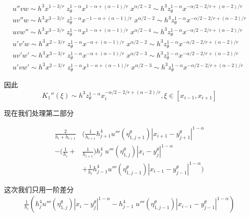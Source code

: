 \documentclass{ctexart}
\begin{document}
\begin{gather}
    u''vw \sim h^3 x^{1-3/r} \; z_\theta^{1-\alpha} x^{1-\alpha + (\alpha-1)/r}\; x^{\alpha/2-2}
    \sim h^3 z_\theta^{1-\alpha} x^{-\alpha/2-2/r+(\alpha-2)/r}   \\
    uv''w \sim h^3 x^{3-3/r} \; z_\theta^{1-\alpha} x^{-1-\alpha + (\alpha-1)/r} \; x^{\alpha/2-2}
    \sim h^3z_\theta^{1-\alpha}x^{-\alpha/2-2/r+(\alpha-2)/r}  \\
    uvw'' \sim h^3 x^{3-3/r} \; z_\theta^{1-\alpha} x^{1-\alpha + (\alpha-1)/r} \; x^{\alpha/2-4}
    \sim h^3z_\theta^{1-\alpha}x^{-\alpha/2-2/r+(\alpha-2)/r}   \\
    u'v'w \sim h^3 x^{2-3/r}\; z_\theta^{1-\alpha} x^{-\alpha + (\alpha-1)/r} \; x^{\alpha/2-2}
    \sim h^3z_\theta^{1-\alpha}x^{-\alpha/2-2/r+(\alpha-2)/r}   \\
    uv'w' \sim h^3 x^{3-3/r} \; z_\theta^{1-\alpha} x^{-\alpha + (\alpha-1)/r} \; x^{\alpha/2-3}
    \sim h^3z_\theta^{1-\alpha}x^{-\alpha/2-2/r+(\alpha-2)/r}   \\
    u'vw' \sim h^3 x^{2-3/r}\;  z_\theta^{1-\alpha} x^{1-\alpha + (\alpha-1)/r} \; x^{\alpha/2-3}
    \sim h^3z_\theta^{1-\alpha}x^{-\alpha/2-2/r+(\alpha-2)/r}
\end{gather}

因此
\begin{equation}
    K_1''(\xi) \sim h^3 z_\theta^{1-\alpha} x_i^{-\alpha/2-2/r+(\alpha-2)/r} , \xi \in [x_{i-1}, x_{i+1}]
\end{equation}

现在我们处理第二部分

\begin{equation}
    \begin{aligned}
        \frac{2}{h_i + h_{i+1}}
                             & ( \frac{1}{h_{i+1}}  h_{j+1}^{4} u'''(\eta_{1,j+1}^\theta) |x_{i+1} - y_{j+1}^\theta|^{1-\alpha} \\
        - (\frac{1}{h_{i}} + & \frac{1}{h_{i+1}}) h_j^{4} \; u'''(\eta_{1,j}^\theta) |x_i - y_j^\theta|^{1-\alpha}              \\
                             & +  \frac{1}{h_{i}} h_{j-1}^{4} u'''(\eta_{1,j-1}^\theta) |x_{i-1} - y_{j-1}^\theta|^{1-\alpha} )
    \end{aligned}
\end{equation}

这次我们只用一阶差分
\begin{equation}
    \begin{aligned}
        \frac{1}{h_{i}} ( h_{j}^{4} u'''(\eta_{1,j}^\theta) |x_{i} - y_{j}^\theta|^{1-\alpha}
        - h_{j-1}^{4} \; u'''(\eta_{1,j-1}^\theta) |x_{i-1} - y_{j-1}^\theta|^{1-\alpha} )
    \end{aligned}
\end{equation}
\end{document}
